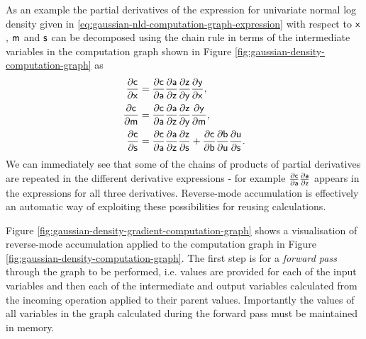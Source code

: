 As an example the partial derivatives of the expression for univariate normal log density given in \eqref{eq:gaussian-nld-computation-graph-expression} with respect to $\mathsf{x}$, $\mathsf{m}$ and $\mathsf{s}$ can be decomposed using the chain rule in terms of the intermediate variables in the computation graph shown in Figure \ref{fig:gaussian-density-computation-graph} as
\begin{align}
  \frac{\partial \mathsf{c}}{\partial \mathsf{x}} &=
  \frac{\partial \mathsf{c}}{\partial \mathsf{a}} 
  \frac{\partial \mathsf{a}}{\partial \mathsf{z}}
  \frac{\partial \mathsf{z}}{\partial \mathsf{y}}
  \frac{\partial \mathsf{y}}{\partial \mathsf{x}},
  \\
  \frac{\partial \mathsf{c}}{\partial \mathsf{m}} &=
  \frac{\partial \mathsf{c}}{\partial \mathsf{a}} 
  \frac{\partial \mathsf{a}}{\partial \mathsf{z}}
  \frac{\partial \mathsf{z}}{\partial \mathsf{y}}
  \frac{\partial \mathsf{y}}{\partial \mathsf{m}},
  \\
  \frac{\partial \mathsf{c}}{\partial \mathsf{s}} &=
  \frac{\partial \mathsf{c}}{\partial \mathsf{a}} 
  \frac{\partial \mathsf{a}}{\partial \mathsf{z}}
  \frac{\partial \mathsf{z}}{\partial \mathsf{s}} +
  \frac{\partial \mathsf{c}}{\partial \mathsf{b}} 
  \frac{\partial \mathsf{b}}{\partial \mathsf{u}}
  \frac{\partial \mathsf{u}}{\partial \mathsf{s}}.
\end{align}
We can immediately see that some of the chains of products of partial derivatives are repeated in the different derivative expressions - for example $\frac{\partial \mathsf{c}}{\partial \mathsf{a}} \frac{\partial \mathsf{a}}{\partial \mathsf{z}}$ appears in the expressions for all three derivatives. Reverse-mode accumulation is effectively an automatic way of exploiting these possibilities for reusing calculations.

Figure \ref{fig:gaussian-density-gradient-computation-graph} shows a visualisation of reverse-mode accumulation applied to the computation graph in Figure \ref{fig:gaussian-density-computation-graph}. The first step is for a \emph{forward pass} through the graph to be performed, i.e. values are provided for each of the input variables and then each of the intermediate and output variables calculated from the incoming operation applied to their parent values. Importantly the values of all variables in the graph calculated during the forward pass must be maintained in memory. 


